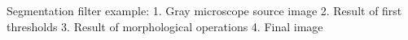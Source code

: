 \label{fig:segmentation}
Segmentation filter example: 1. Gray microscope source image 2. Result of first thresholds 3. Result of morphological operations 4. Final image
  
